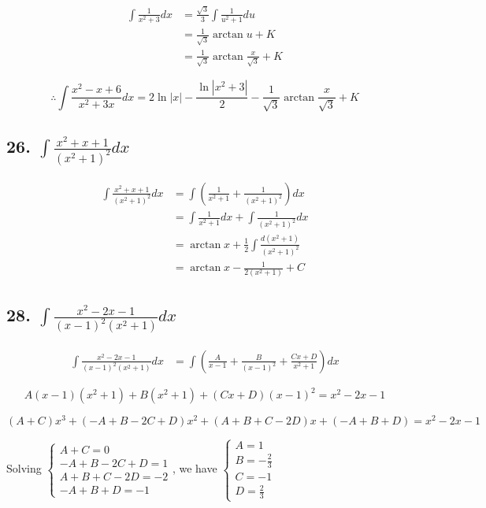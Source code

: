 \documentclass{article}
\begin{document}
    $$\begin{aligned}
        \int \frac{1}{x^2 + 3} dx &= \frac{\sqrt 3}{3} \int \frac{1}{u^2 + 1} du \\
        &= \frac{1}{\sqrt 3}\arctan u + K \\
        &= \frac{1}{\sqrt 3}\arctan \frac{x}{\sqrt 3} + K
    \end{aligned}$$

    $$\therefore \int \frac{x^2 - x + 6}{x^2 + 3x} dx = 2\ln|x| - \frac{\ln|x^2 + 3|}{2} - \frac{1}{\sqrt 3} \arctan \frac{x}{\sqrt 3} + K$$

    \subsection*{26. $\int \frac{x^2 + x + 1}{(x^2 + 1)^2} dx$}

    $$\begin{aligned}
        \int \frac{x^2 + x + 1}{(x^2 + 1)^2} dx &= \int (\frac{1}{x^2 + 1} + \frac{1}{(x^2 + 1)^2}) dx \\
        &= \int \frac{1}{x^2 + 1} dx + \int \frac{1}{(x^2 + 1)^2} dx \\
        &= \arctan x + \frac 1 2 \int \frac{d(x^2 + 1)}{(x^2 + 1)^2} \\
        &= \arctan x - \frac{1} {2(x^2 + 1)} + C
    \end{aligned}$$

    \subsection*{28. $\int \frac{x^2 - 2x - 1}{(x - 1)^2(x^2 + 1)}dx$}

    $$\begin{aligned}
        \int \frac{x^2 - 2x - 1}{(x - 1)^2(x^2 + 1)}dx &= \int (\frac{A}{x - 1} + \frac{B}{(x - 1)^2} + \frac{Cx + D}{x^2 + 1})dx
    \end{aligned}$$

    $$A(x - 1)(x^2 + 1) + B(x^2 + 1) + (Cx + D)(x - 1)^2 = x^2 - 2x - 1$$


    $$(A + C)x^3 + (-A + B - 2C + D) x^2 + (A + B + C - 2D) x + (-A + B + D) = x^2 - 2x - 1$$

    Solving $\left\{ \begin{array}{ll}
        A + C = 0 \\
        -A + B - 2C + D = 1 \\
        A + B + C - 2D = -2 \\
        -A + B + D = -1
    \end{array} \right.$, we have $\left\{ \begin{array}{ll}
        A = 1 \\
        B = -\frac 2 3 \\
        C = -1 \\
        D = \frac 2 3
    \end{array} \right.$
\end{document}
